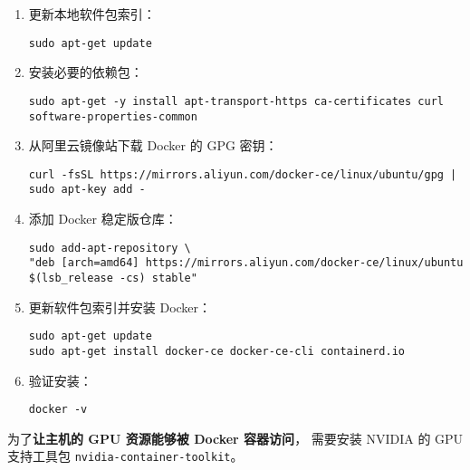 \documentclass[UTF8]{ctexart}
\begin{document}
\begin{tcolorbox}[colback=gray!5!white, colframe=gray!40!black, title=\textbf{Ubuntu 系统中 Docker 安装步骤}, breakable]
\begin{enumerate}[label={\textbf{步骤 \arabic*:}}, leftmargin=1.6cm, itemsep=0.6em]
    \item 更新本地软件包索引：
\begin{verbatim}
sudo apt-get update
\end{verbatim}

    \item 安装必要的依赖包：
\begin{verbatim}
sudo apt-get -y install apt-transport-https ca-certificates curl software-properties-common
\end{verbatim}

    \item 从阿里云镜像站下载 Docker 的 GPG 密钥：
\begin{verbatim}
curl -fsSL https://mirrors.aliyun.com/docker-ce/linux/ubuntu/gpg | sudo apt-key add -
\end{verbatim}

    \item 添加 Docker 稳定版仓库：
\begin{verbatim}
sudo add-apt-repository \
"deb [arch=amd64] https://mirrors.aliyun.com/docker-ce/linux/ubuntu $(lsb_release -cs) stable"
\end{verbatim}

    \item 更新软件包索引并安装 Docker：
\begin{verbatim}
sudo apt-get update
sudo apt-get install docker-ce docker-ce-cli containerd.io
\end{verbatim}

    \item 验证安装：
\begin{verbatim}
docker -v
\end{verbatim}
\end{enumerate}
\end{tcolorbox}

为了\textbf{让主机的 GPU 资源能够被 Docker 容器访问}，
需要安装 NVIDIA 的 GPU 支持工具包 \texttt{nvidia-container-toolkit}。
\end{document}
